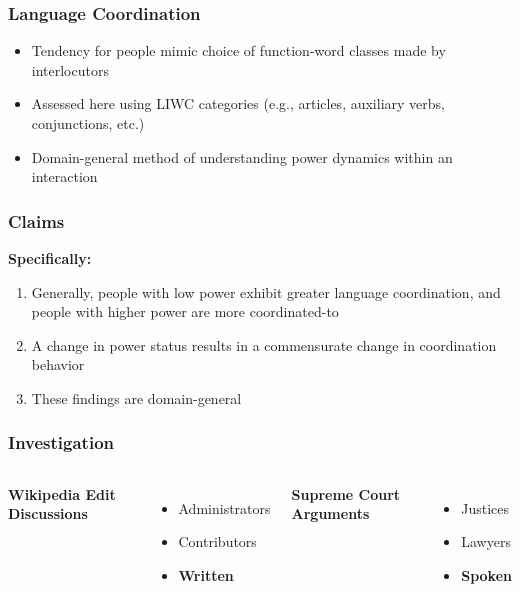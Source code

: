 \documentclass{beamer}
\begin{document}
\begin{frame}
\frametitle{Language Coordination}
\begin{itemize}
	\item Tendency for people mimic choice of function-word classes made by interlocutors
	\item Assessed here using LIWC categories (e.g., articles, auxiliary verbs, conjunctions, etc.)
	\item Domain-general method of understanding power dynamics within an interaction 
\end{itemize}
\end{frame}
\begin{frame}
\frametitle{Claims}
\textbf{Specifically:}
\begin{enumerate}
	\item Generally, people with low power exhibit greater language coordination, and people with higher power are more coordinated-to

	\item A change in power status results in a commensurate change in coordination behavior 

	\item These findings are domain-general
\end{enumerate}
\end{frame}
\begin{frame}
\frametitle{Investigation}
\begin{columns}[c]
\textbf{Wikipedia Edit Discussions}
\begin{itemize}
	\item Administrators
	\item Contributors
	\item \textbf{Written}
\end{itemize}

\textbf{Supreme Court Arguments}
\begin{itemize}
	\item Justices
	\item Lawyers
	\item \textbf{Spoken}
\end{itemize}
\end{columns}

\end{frame}
\end{document}
